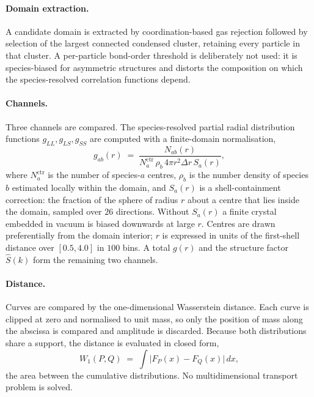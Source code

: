 \paragraph{Domain extraction.} A candidate domain is extracted by coordination-based gas
rejection followed by selection of the largest connected condensed cluster, retaining every
particle in that cluster. A per-particle bond-order threshold is deliberately not used: it
is species-biased for asymmetric structures and distorts the composition on which the
species-resolved correlation functions depend.

\paragraph{Channels.} Three channels are compared. The species-resolved partial radial
distribution functions $g_{LL}, g_{LS}, g_{SS}$ are computed with a finite-domain
normalisation,
\begin{equation}
  g_{ab}(r) \;=\;
  \frac{N_{ab}(r)}{N^{\mathrm{ctr}}_{a}\, \rho_b\, 4\pi r^2 \Delta r\, S_a(r)} ,
  \label{eq:partial-rdf}
\end{equation}
where $N^{\mathrm{ctr}}_a$ is the number of species-$a$ centres, $\rho_b$ is the number
density of species $b$ estimated locally within the domain, and $S_a(r)$ is a
shell-containment correction: the fraction of the sphere of radius $r$ about a centre that
lies inside the domain, sampled over $26$ directions. Without $S_a(r)$ a finite crystal
embedded in vacuum is biased downwards at large $r$. Centres are drawn preferentially from
the domain interior; $r$ is expressed in units of the first-shell distance over
$[0.5, 4.0]$ in $100$ bins. A total $g(r)$ and the structure factor $\hat{S}(k)$ form the
remaining two channels.

\paragraph{Distance.} Curves are compared by the one-dimensional Wasserstein distance. Each
curve is clipped at zero and normalised to unit mass, so only the position of mass along the
abscissa is compared and amplitude is discarded. Because both distributions share a support,
the distance is evaluated in closed form,
\begin{equation}
  W_1(P,Q) \;=\; \int \bigl| F_P(x) - F_Q(x) \bigr| \, dx ,
  \label{eq:wasserstein}
\end{equation}
the area between the cumulative distributions. No multidimensional transport problem is
solved.


